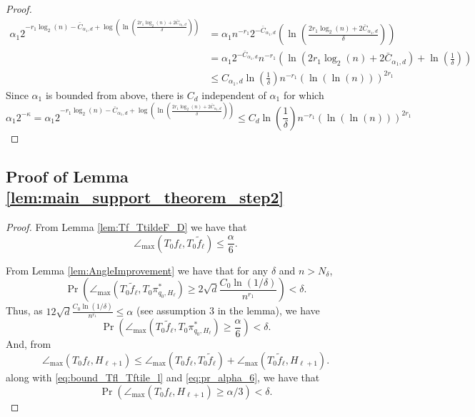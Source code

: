 \documentclass[12pt]{article}
\theoremstyle{remark}
\newcommand{\wtilde}[1]{\widetilde{#1}}
\newcommand{\maxangle}{\angle_{\max}}
\begin{document}
\begin{appendices}
\begin{proof}
       \begin{equation}
    \begin{array}{ll}
     \alpha_1 2^{-r_1\log_2(n) - \bar{C}_{\alpha_1,d} + \log\left(\ln\left(\frac{2r_1\log_2(n) + 2 \bar{C}_{\alpha_1,d}}{\delta}\right)\right)} &=   \alpha_1 n^{-r_1}2^{-\bar{C}_{ \alpha_1,d}}\left(\ln\left(\frac{2r_1\log_2(n) + 2\bar{C}_{ \alpha_1,d}}{\delta}\right)\right)
     \\
         & =  \alpha_1 2^{-\bar{C}_{\alpha_1,d}} n^{-r_1}\left(\ln\left(2r_1\log_2(n) + 2\bar{C}_{ \alpha_1,d}\right)+\ln\left(\frac{1}{\delta}\right)\right)\\
         & \leq C_{ \alpha_1,d} \ln\left(\frac{1}{\delta}\right) n^{-r_1}\left(\ln\left(\ln(n) \right)\right)^{2r_1}
    \end{array}
    \end{equation}
    Since $\alpha_1$ is bounded from above, there is  $ C_{d}$ independent of $\alpha_1$ for which
    \begin{equation}
      \alpha_1 2^{-\kappa} = \alpha_1 2^{-r_1\log_2(n) - \bar{C}_{ \alpha_1,d} + \log\left(\ln\left(\frac{2r_1\log_2(n) + 2 \bar{C}_{ \alpha_1,d}}{\delta}\right)\right)} \leq C_{ d} \ln\left(\frac{1}{\delta}\right) n^{-r_1}\left(\ln\left(\ln(n) \right)\right)^{2r_1}
    \end{equation}
\end{proof}


\subsection{Proof of Lemma \ref{lem:main_support_theorem_step2}}
 \label{subsubsec:proof_of_main_support_lemma}
 


\begin{proof}
From Lemma \ref{lem:Tf_TtildeF_D} we have that 
\begin{equation}\label{eq:bound_Tfl_Tftile_l}
\maxangle(T_0 f_\ell, T_0 {\wtilde{f}_\ell}) 
\leq  
\frac{\alpha}{6}.    
\end{equation}

From Lemma \ref{lem:AngleImprovement} we have that for any $\delta$ and $n>N_{\delta}$, 
\[
\Pr(\maxangle(T_0\wtilde f_\ell, T_0\pi^*_{q_0, H_\ell}) \geq 2\sqrt{d}\frac{C_0 \ln(1/\delta)}{n^{r_1}}) < \delta.
\]
Thus, as $ 12\sqrt{d} \frac{C_0 \ln(1/\delta)}{n^{r_1}}\leq \alpha $  (see assumption 3 in the lemma), we have 
\begin{equation}\label{eq:pr_alpha_6}
\Pr(\maxangle(T_0\wtilde f_\ell, T_0\pi^*_{q_0, H_\ell}) \geq \frac{\alpha}{6}) < \delta.
\end{equation}
And, from
\[
\maxangle (T_0f_{\ell}, H_{\ell+1}) \leq \maxangle (T_0f_\ell, T_0\wtilde{f}_\ell)  + \maxangle (T_0\wtilde{f}_\ell, H_{\ell+1}). 
\]
along with \eqref{eq:bound_Tfl_Tftile_l} and \eqref{eq:pr_alpha_6}, we have that 
\begin{equation}\label{eq:pr_alpha_3}
\Pr\left(\maxangle (T_0f_{\ell}, H_{\ell+1}) \geq \alpha/3\right) < \delta.    
\end{equation}


\end{proof}
\end{appendices}
\end{document}
